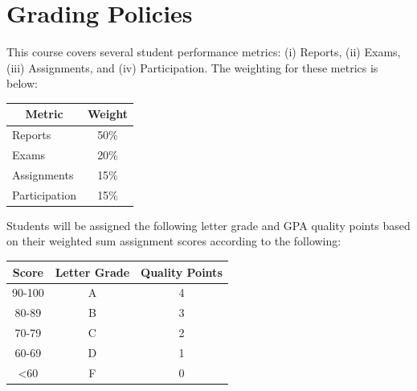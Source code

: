 \documentclass[
	letterpaper, %
	fontsize=10pt, %
	twoside=true, %
	numbers=noenddot, %
]{kaobook}
\begin{document}
\section*{Grading Policies} 
This course covers several student performance metrics: (i) Reports, (ii) Exams, (iii) Assignments, and (iv) Participation. The weighting for these metrics is below:

\begin{table}[ht!]
    \begin{tabular}{l | c}
        \toprule
        \multicolumn{1}{c|}{\textbf{Metric}} & \textbf{Weight} \\
        \midrule
        Reports         & 50\% \\
        Exams           & 20\% \\
        Assignments     & 15\% \\
        Participation   & 15\% \\
        \bottomrule
    \end{tabular}
\end{table}

Students will be assigned the following letter grade and GPA quality points based on their weighted sum assignment scores according to the following:

\begin{table}[h!]
    \begin{tabular}{c | c | c}
        \toprule
        \textbf{Score} & \textbf{Letter Grade} & \textbf{Quality Points} \\
        \midrule
        90-100              & A     & 4 \\
        80-89               & B     & 3 \\
        70-79               & C     & 2 \\
        60-69\footnotemark  & D     & 1 \\
        <60                 & F     & 0 \\
        \bottomrule
    \end{tabular}
\end{table}

\pagebreak
\end{document}
